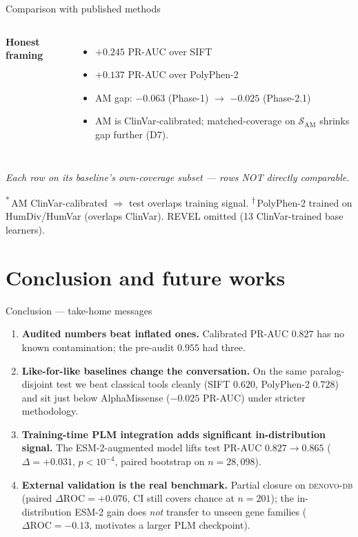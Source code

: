 \documentclass[aspectratio=169,10pt]{beamer}
\begin{document}
\begin{frame}{Comparison with published methods}
\begin{columns}[T]
    \textbf{\textcolor{kkuGreen}{Honest framing}}
    \begin{itemize}\setlength{\itemsep}{0.04em}
      \item $+0.245$ PR-AUC over SIFT
      \item $+0.137$ PR-AUC over PolyPhen-2
      \item AM gap: $-0.063$ (Phase-1) $\to$ $\mathbf{-0.025}$ (Phase-2.1)
      \item AM is ClinVar-calibrated; matched-coverage on
            $\mathcal{S}_{\text{AM}}$ shrinks gap further (D7).
    \end{itemize}
  \end{columns}

  \vspace{0.3em}
  \scriptsize
  \emph{Each row on its baseline's own-coverage subset --- rows NOT directly comparable.}\par
  \textsuperscript{*}\,AM ClinVar-calibrated $\Rightarrow$ test overlaps training signal.\;
  \textsuperscript{$\dagger$}\,PolyPhen-2 trained on HumDiv/HumVar (overlaps ClinVar).\;
  REVEL omitted (13 ClinVar-trained base learners).
\end{frame}

\section{Conclusion and future works}

\begin{frame}{Conclusion --- take-home messages}
  \footnotesize
  \begin{enumerate}\setlength{\itemsep}{0.6em}
    \item \textbf{Audited numbers beat inflated ones.}
          Calibrated PR-AUC $0.827$ has no known contamination;
          the pre-audit $0.955$ had three.
    \item \textbf{Like-for-like baselines change the conversation.}
          On the same paralog-disjoint test we beat classical tools
          cleanly (SIFT $0.620$, PolyPhen-2 $0.728$) and sit just
          below AlphaMissense ($-0.025$ PR-AUC) under stricter
          methodology.
    \item \textbf{Training-time PLM integration adds significant
          in-distribution signal.} The ESM-2-augmented model lifts
          test PR-AUC $0.827 \to 0.865$
          ($\Delta=+0.031$, $p<10^{-4}$, paired bootstrap on
          $n=28{,}098$).
    \item \textbf{External validation is the real benchmark.}
          Partial closure on \textsc{denovo-db} (paired
          $\Delta\text{ROC}=+0.076$, CI still covers chance at
          $n=201$); the in-distribution ESM-2 gain does \emph{not}
          transfer to unseen gene families
          ($\Delta\text{ROC}=-0.13$, motivates a larger PLM
          checkpoint).
  \end{enumerate}
\end{frame}
\end{document}
